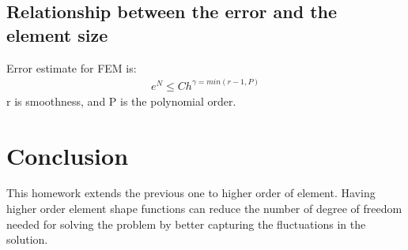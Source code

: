 \documentclass[paper=a4, fontsize=11pt]{article} %
\begin{document}
        


\subsection{Relationship between the error and the element size}
Error estimate for FEM is:
\begin{eqnarray}
e^N \leq Ch^{\gamma = min (r-1, P)}
\end{eqnarray}
r is smoothness, and P is the polynomial order.







\section{Conclusion}

This homework extends the previous one to higher order of element. Having higher order element shape functions can reduce the number of degree of freedom needed for solving the problem by better capturing the fluctuations in the solution. 
\end{document}
